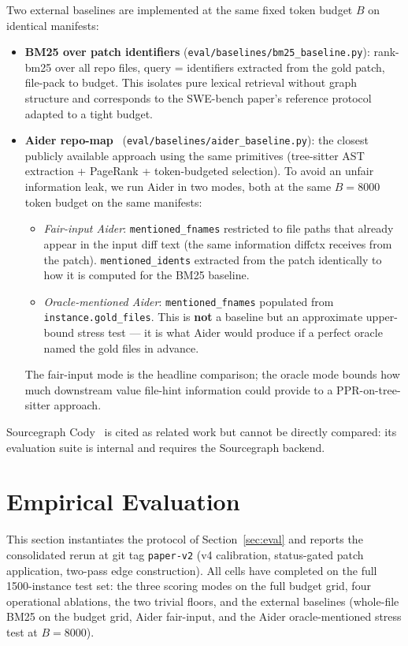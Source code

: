 \documentclass[11pt, a4paper]{article}
\begin{document}
Two external baselines are implemented at the same fixed token budget $B$ on identical manifests:
\begin{itemize}
    \item \textbf{BM25 over patch identifiers} (\texttt{eval/baselines/bm25\_baseline.py}): rank-bm25 over all repo files, query = identifiers extracted from the gold patch, file-pack to budget. This isolates pure lexical retrieval without graph structure and corresponds to the SWE-bench paper's reference protocol~\cite{jimenez2024swebench} adapted to a tight budget.
    \item \textbf{Aider repo-map}~\cite{aider2023repomap} (\texttt{eval/baselines/aider\_baseline.py}): the closest publicly available approach using the same primitives (tree-sitter AST extraction + PageRank + token-budgeted selection). To avoid an unfair information leak, we run Aider in two modes, both at the same $B{=}8000$ token budget on the same manifests:
    \begin{itemize}
        \item \emph{Fair-input Aider}: \texttt{mentioned\_fnames} restricted to file paths that already appear in the input diff text (the same information diffctx receives from the patch). \texttt{mentioned\_idents} extracted from the patch identically to how it is computed for the BM25 baseline.
        \item \emph{Oracle-mentioned Aider}: \texttt{mentioned\_fnames} populated from \texttt{instance.gold\_files}. This is \textbf{not} a baseline but an approximate upper-bound stress test --- it is what Aider would produce if a perfect oracle named the gold files in advance.
    \end{itemize}
    The fair-input mode is the headline comparison; the oracle mode bounds how much downstream value file-hint information could provide to a PPR-on-tree-sitter approach.
\end{itemize}
Sourcegraph Cody~\cite{hartman2024recsys} is cited as related work but cannot be directly compared: its evaluation suite is internal and requires the Sourcegraph backend.

\newpage
\section{Empirical Evaluation}
\label{sec:prelim-results}

This section instantiates the protocol of Section~\ref{sec:eval} and reports the consolidated rerun at git tag \texttt{paper-v2} (v4 calibration, status-gated patch application, two-pass edge construction). All cells have completed on the full 1500-instance test set: the three scoring modes on the full budget grid, four operational ablations, the two trivial floors, and the external baselines (whole-file BM25 on the budget grid, Aider fair-input, and the Aider oracle-mentioned stress test at $B{=}8000$).
\end{document}
